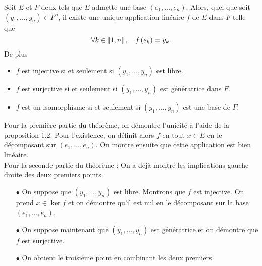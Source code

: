 \documentclass{magnolia}
\begin{document}

\begin{proposition}[utile=3]
Soit $E$ et $F$ deux \Kevs tels que $E$ admette une base $(e_1,\ldots,e_n)$.
Alors, quel que soit $(y_1,\ldots,y_n)\in F^n$, il existe une unique application
linéaire $f$ de $E$ dans $F$ telle que
\[\forall k\in\left\llbracket 1,n\right\rrbracket ,\quad f\left(e_k\right)=y_k.\]
De plus
\begin{itemize}
\item $f$ est injective si et seulement si $(y_1,\ldots,y_n)$ est libre.
\item $f$ est surjective si et seulement si $(y_1,\ldots,y_n)$ est génératrice dans $F$.
\item $f$ est un isomorphisme si et seulement si $(y_1,\ldots,y_n)$ est une base de $F$.
\end{itemize}
\end{proposition}

\begin{preuve}
Pour la première partie du théorème, on démontre l'unicité à l'aide de la proposition 1.2.
Pour l'existence, on définit alors $f$ en tout $x\in E$ en le décomposant sur $(e_1,\ldots,e_n)$. On montre ensuite que cette application est bien linéaire.\\


Pour la seconde partie du théorème :
On a déjà montré les implications gauche droite des deux premiers points. 
\begin{itemize}
\item[$\bullet$] On suppose que $(y_1,\ldots,y_n)$ est libre. Montrons que $f$ est injective. On prend $x\in \ker f$ et on démontre qu'il est nul en  le décomposant sur la base $(e_1,\ldots,e_n)$.
\item[$\bullet$] On suppose maintenant que $(y_1,\ldots,y_n)$ est génératrice et on démontre que $f$ est surjective.
\item[$\bullet$] On obtient le troisième point en combinant les deux premiers.
\end{itemize}
\end{preuve}
\end{document}
